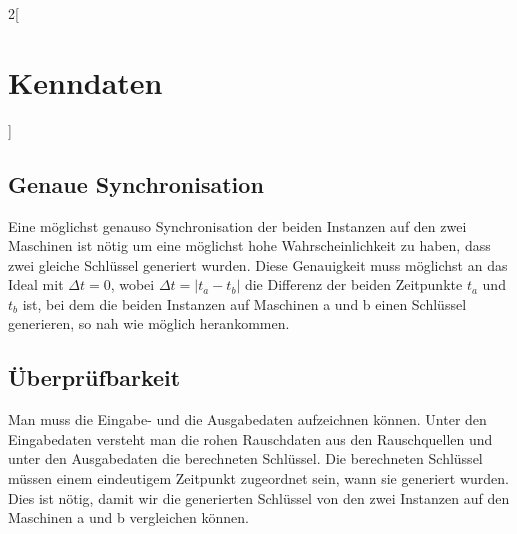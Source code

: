 \begin{multicols*}{2}[\section{Kenndaten}]

\subsection{Genaue Synchronisation}

Eine möglichst genauso Synchronisation der beiden Instanzen auf den zwei Maschinen
ist nötig um eine möglichst hohe Wahrscheinlichkeit zu haben, dass zwei gleiche Schlüssel
generiert wurden. Diese Genauigkeit muss möglichst an das Ideal mit $\Delta t = 0$,
wobei $\Delta t=|t_a - t_b|$ die Differenz der beiden Zeitpunkte $t_a$ und $t_b$ ist,
bei dem die beiden Instanzen auf Maschinen a und b einen Schlüssel generieren,
so nah wie möglich herankommen.

\subsection{Überprüfbarkeit}

Man muss die Eingabe- und die Ausgabedaten aufzeichnen können. Unter den Eingabedaten
versteht man die rohen Rauschdaten aus den Rauschquellen und unter den Ausgabedaten
die berechneten Schlüssel. Die berechneten Schlüssel müssen einem eindeutigem Zeitpunkt
zugeordnet sein, wann sie generiert wurden. Dies ist nötig, damit wir die generierten
Schlüssel von den zwei Instanzen auf den Maschinen a und b vergleichen können.

\end{multicols*}

